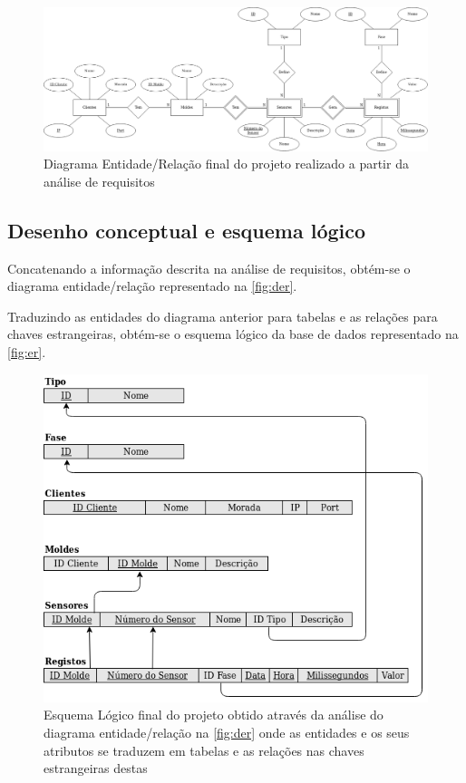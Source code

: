 \documentclass[11pt,twoside,a4paper]{report}
\begin{document}
\begin{landscape}
	\begin{figure}
		\begin{center}
			\includegraphics[width=1.4\textwidth]{diagrama_entidade_relacao} %
			\caption[Diagrama Entidade/Relação final do projeto]{Diagrama Entidade/Relação final do projeto realizado a partir da análise de requisitos}
			\label{fig:der}
		\end{center}
	\end{figure}
\end{landscape}
\subsection{Desenho conceptual e esquema lógico}
Concatenando a informação descrita na análise de requisitos, obtém-se o diagrama entidade/relação representado na \autoref{fig:der}.\par
Traduzindo as entidades do diagrama anterior para tabelas e as relações para chaves estrangeiras, obtém-se o esquema lógico da base de dados representado na \autoref{fig:er}.
\begin{figure}[H]
	\begin{center}
		\includegraphics[width=1\textwidth]{esquema_relacional} %
		\caption[Esquema Lógico final do projeto]{Esquema Lógico final do projeto obtido através da análise do diagrama entidade/relação na \autoref{fig:der} onde as entidades e os seus atributos se traduzem em tabelas e as relações nas chaves estrangeiras destas}
		\label{fig:er}
	\end{center}
\end{figure}
\end{document}
